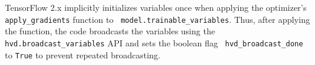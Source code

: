 TensorFlow 2.x implicitly initializes variables once when applying the
optimizer's {\tt apply\_gradients} function to {\tt
model.trainable\_variables}.
Thus, after applying the function, the code broadcasts the variables
using the {\tt hvd.broadcast\_variables} API and sets the boolean flag {\tt
hvd\_broadcast\_done} to {\tt True} to prevent repeated broadcasting.
